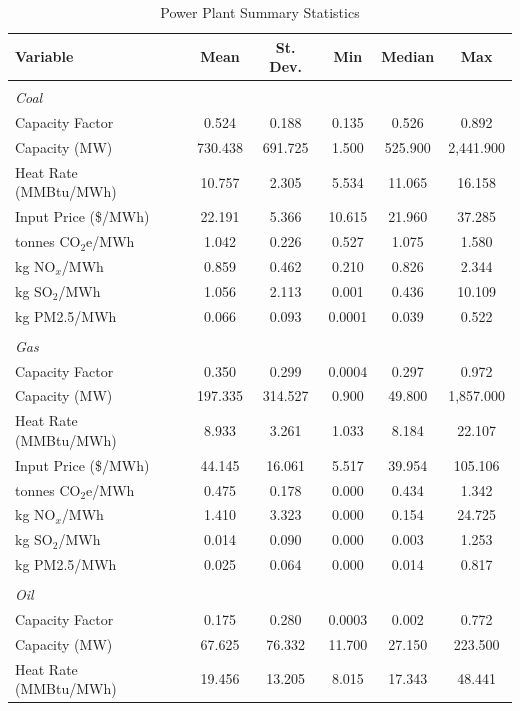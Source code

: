 \begin{table}
    \centering
    \caption{Power Plant Summary Statistics}
\begin{tabular}{l c c c c c}
    \hline\hline
    Variable & Mean & St. Dev. & Min & Median & Max \\
    \hline\\[-1.8ex]
    \textit{Coal} \\
    \hline
    Capacity Factor & 0.524 & 0.188 & 0.135 & 0.526 & 0.892 \\ 
    Capacity (MW) & 730.438 & 691.725 & 1.500 & 525.900 & 2,441.900 \\ 
    Heat Rate (MMBtu/MWh) & 10.757 & 2.305 & 5.534 & 11.065 & 16.158 \\ 
    Input Price (\$/MWh) & 22.191 & 5.366 & 10.615 & 21.960 & 37.285 \\ 
    tonnes CO$_2$e/MWh & 1.042 & 0.226 & 0.527 & 1.075 & 1.580 \\ 
    kg NO$_x$/MWh & 0.859 & 0.462 & 0.210 & 0.826 & 2.344 \\ 
    kg SO$_2$/MWh & 1.056 & 2.113 & 0.001 & 0.436 & 10.109 \\ 
    kg PM2.5/MWh & 0.066 & 0.093 & 0.0001 & 0.039 & 0.522 \\ \\[-1.8ex]
    \textit{Gas} \\
    \hline
    Capacity Factor & 0.350 & 0.299 & 0.0004 & 0.297 & 0.972 \\ 
    Capacity (MW) & 197.335 & 314.527 & 0.900 & 49.800 & 1,857.000 \\ 
    Heat Rate (MMBtu/MWh) & 8.933 & 3.261 & 1.033 & 8.184 & 22.107 \\ 
    Input Price (\$/MWh) & 44.145 & 16.061 & 5.517 & 39.954 & 105.106 \\ 
    tonnes CO$_2$e/MWh & 0.475 & 0.178 & 0.000 & 0.434 & 1.342 \\ 
    kg NO$_x$/MWh & 1.410 & 3.323 & 0.000 & 0.154 & 24.725 \\ 
    kg SO$_2$/MWh & 0.014 & 0.090 & 0.000 & 0.003 & 1.253 \\ 
    kg PM2.5/MWh & 0.025 & 0.064 & 0.000 & 0.014 & 0.817 \\ \\[-1.8ex]
    \textit{Oil} \\
    \hline
    Capacity Factor & 0.175 & 0.280 & 0.0003 & 0.002 & 0.772 \\ 
    Capacity (MW) & 67.625 & 76.332 & 11.700 & 27.150 & 223.500 \\ 
    Heat Rate (MMBtu/MWh) & 19.456 & 13.205 & 8.015 & 17.343 & 48.441 \\ 

\end{tabular}
\end{table}
